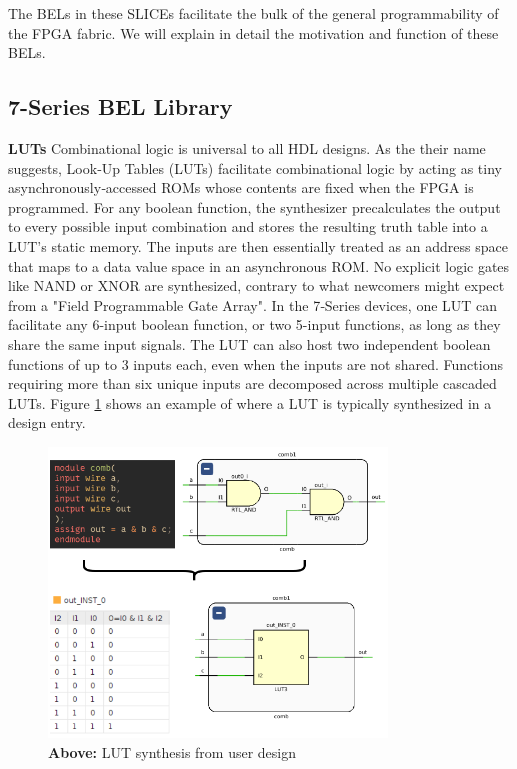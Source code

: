 \documentclass[twocolumn]{article}
\begin{document}
    The BELs in these SLICEs facilitate the bulk of the general programmability of the FPGA fabric. 
    We will explain in detail the motivation and function of these BELs. 

    \subsection{7-Series BEL Library}

    \textbf{LUTs} \quad
        Combinational logic is universal to all HDL designs. 
        As the their name suggests, Look‑Up Tables (LUTs) facilitate combinational logic by acting as tiny asynchronously‑accessed ROMs whose contents are fixed when the FPGA is programmed.  
        For any boolean function, the synthesizer precalculates the output to every possible input combination and stores the resulting truth table into a LUT's static memory. 
        The inputs are then essentially treated as an address space that maps to a data value space in an asynchronous ROM. 
        No explicit logic gates like NAND or XNOR are synthesized, contrary to what newcomers might expect from a "Field Programmable Gate Array". 
        In the 7‑Series devices, one LUT can facilitate any 6-input boolean function, or two 5-input functions, as long as they share the same input signals.  
        The LUT can also host two independent boolean functions of up to 3 inputs each, even when the inputs are not shared.  
        Functions requiring more than six unique inputs are decomposed across multiple cascaded LUTs.
        Figure \ref{fig:lut_synthesis} shows an example of where a LUT is typically synthesized in a design entry. 

        \begin{figure}[]
            \centering
            \includegraphics[width=9.0cm]{figures/lut_synthesis.png}
            \caption{\textbf{Above:} LUT synthesis from user design}
            \label{fig:lut_synthesis}
        \end{figure}
\end{document}
